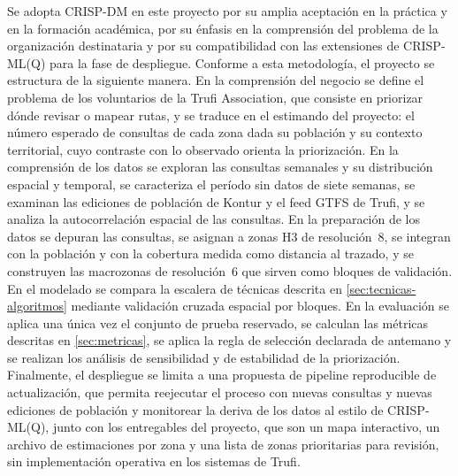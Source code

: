 Se adopta CRISP-DM en este proyecto por su amplia aceptación en la práctica y en la
formación académica, por su énfasis en la comprensión del problema de la organización
destinataria y por su compatibilidad con las extensiones de CRISP-ML(Q) para la fase de
despliegue. Conforme a esta metodología, el proyecto se estructura de la siguiente manera.
En la comprensión del negocio se define el problema de los voluntarios de la Trufi
Association, que consiste en priorizar dónde revisar o mapear rutas, y se traduce en el
estimando del proyecto: el número esperado de consultas de cada zona dada su población y su
contexto territorial, cuyo contraste con lo observado orienta la priorización. En la
comprensión de los datos se exploran las consultas semanales y su distribución espacial y
temporal, se caracteriza el período sin datos de siete semanas, se examinan las ediciones de
población de Kontur y el feed GTFS de Trufi, y se analiza la autocorrelación espacial de las
consultas. En la preparación de los datos se depuran las consultas, se asignan a zonas H3 de
resolución~8, se integran con la población y con la cobertura medida como distancia al
trazado, y se construyen las macrozonas de resolución~6 que sirven como bloques de
validación. En el modelado se compara la escalera de técnicas descrita en
\ref{sec:tecnicas-algoritmos} mediante validación cruzada espacial por bloques. En la
evaluación se aplica una única vez el conjunto de prueba reservado, se calculan las métricas
descritas en \ref{sec:metricas}, se aplica la regla de selección declarada de antemano y se
realizan los análisis de sensibilidad y de estabilidad de la priorización. Finalmente, el
despliegue se limita a una propuesta de pipeline reproducible de actualización, que permita
reejecutar el proceso con nuevas consultas y nuevas ediciones de población y monitorear la
deriva de los datos al estilo de CRISP-ML(Q), junto con los entregables del proyecto, que
son un mapa interactivo, un archivo de estimaciones por zona y una lista de zonas
prioritarias para revisión, sin implementación operativa en los sistemas de Trufi.
